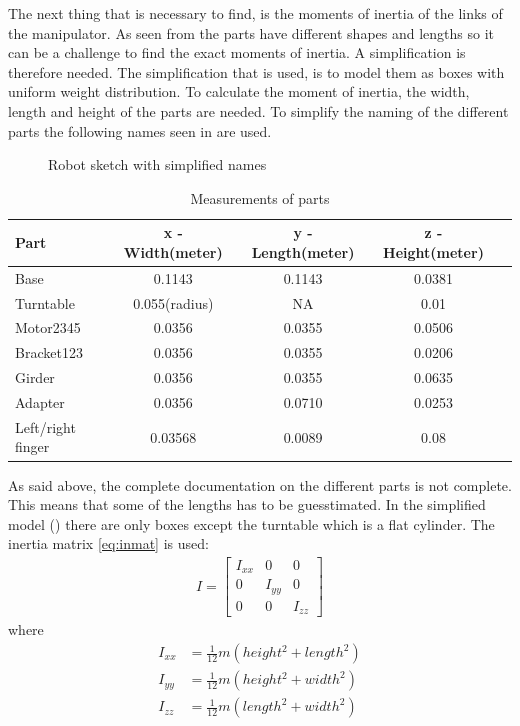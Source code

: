 The next thing that is necessary to find, is the moments of inertia of the links of the manipulator. As seen from  the parts have different shapes and lengths so it can be a challenge to find the exact moments of inertia. A simplification is therefore needed. The simplification that is used, is to model them as boxes with uniform weight distribution. To calculate the moment of inertia, the width, length and height of the parts are needed. To simplify the naming of the different parts the following names seen in  are used.
\begin{figure}[htbp]
  \centering
  
  \caption{Robot sketch with simplified names}
  \label{fig:naming}
\end{figure}
\begin{table}[htbp]
\centering
\caption{Measurements of parts}
\label{table:measurements}
    \begin{tabular}{l c c c r}
        \toprule
        Part  &  x - Width(meter) & y - Length(meter) & z - Height(meter)\\
        \midrule
        Base & 0.1143 & 0.1143 & 0.0381\\
        Turntable & 0.055(radius) & NA & 0.01\\
        Motor2345 & 0.0356 & 0.0355 & 0.0506 \\
        Bracket123 & 0.0356 & 0.0355 & 0.0206 \\
        Girder & 0.0356 & 0.0355 & 0.0635\\
        Adapter & 0.0356 & 0.0710 & 0.0253\\
        Left/right finger & 0.03568 & 0.0089 & 0.08\\
        \bottomrule
    \end{tabular}
\end{table}

As said above, the complete documentation on the different parts is not complete. This means that some of the lengths has to be guesstimated\cite{Crustcrawler}. In the simplified model () there are only boxes except the turntable which is a flat cylinder. The inertia matrix \eqref{eq:inmat} is used:
\begin{align}\label{eq:inmat}
    I = 
    \begin{bmatrix}
        I_{xx} & 0 & 0\\
        0 & I_{yy} & 0\\
        0 & 0 & I_{zz}
    \end{bmatrix}
\end{align}
where
\begin{align*}
    I_{xx} &= \frac{1}{12}m(height^2+length^2)\\
    I_{yy} &= \frac{1}{12}m(height^2+width^2)\\
    I_{zz} &= \frac{1}{12}m(length^2+width^2)
\end{align*}

